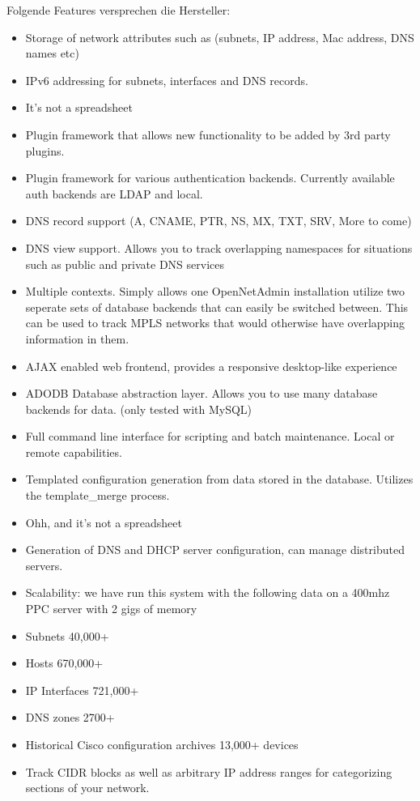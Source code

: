\documentclass[11pt,a4paper,parskip=half]{scrartcl}
\begin{document}
Folgende Features versprechen die Hersteller:
\begin{itemize}
\item{Storage of network attributes such as (subnets, IP address, Mac address, DNS names etc)}
\item{IPv6 addressing for subnets, interfaces and DNS records.}
\item{It's not a spreadsheet}
\item{Plugin framework that allows new functionality to be added by 3rd party plugins.}
\item{Plugin framework for various authentication backends. Currently available auth backends are LDAP and local.}
\item{DNS record support (A, CNAME, PTR, NS, MX, TXT, SRV, More to come)}
\item{DNS view support. Allows you to track overlapping namespaces for situations such as public and private DNS services}
\item{Multiple contexts. Simply allows one OpenNetAdmin installation utilize two seperate sets of database backends that can easily be switched between. This can be used to track MPLS networks that would otherwise have overlapping information in them.}
\item{AJAX enabled web frontend, provides a responsive desktop-like experience}
\item{ADODB Database abstraction layer. Allows you to use many database backends for data. (only tested with MySQL)}
\item{Full command line interface for scripting and batch maintenance. Local or remote capabilities.}
\item{Templated configuration generation from data stored in the database. Utilizes the template\_merge process.}
\item{Ohh, and it's not a spreadsheet}
\item{Generation of DNS and DHCP server configuration, can manage distributed servers.}
\item{Scalability: we have run this system with the following data on a 400mhz PPC server with 2 gigs of memory}
\item{Subnets	40,000+}
\item{Hosts	670,000+}
\item{IP Interfaces	721,000+}
\item{DNS zones	2700+}
\item{Historical Cisco configuration archives	13,000+ devices}
\item{Track CIDR blocks as well as arbitrary IP address ranges for categorizing sections of your network.}

\end{itemize}
\end{document}

